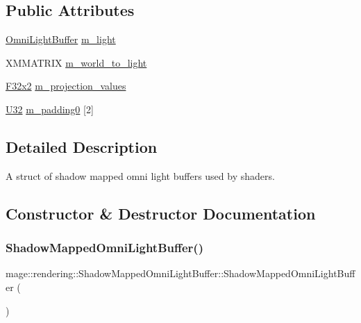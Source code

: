 \subsection*{Public Attributes}
\begin{DoxyCompactItemize}
\item 
\hyperlink{structmage_1_1rendering_1_1_omni_light_buffer}{Omni\+Light\+Buffer} \hyperlink{structmage_1_1rendering_1_1_shadow_mapped_omni_light_buffer_a6b316ed6c8b69d5aeb15fbe93c23de95}{m\+\_\+light}
\item 
X\+M\+M\+A\+T\+R\+IX \hyperlink{structmage_1_1rendering_1_1_shadow_mapped_omni_light_buffer_a6ad3f982000ca1d68c3897589aa89798}{m\+\_\+world\+\_\+to\+\_\+light}
\item 
\hyperlink{namespacemage_aa87237ad091f5cd7da612b8523fc108f}{F32x2} \hyperlink{structmage_1_1rendering_1_1_shadow_mapped_omni_light_buffer_a29016735134bb44c6c6f0d52fbf9ef2c}{m\+\_\+projection\+\_\+values}
\item 
\hyperlink{namespacemage_a41c104c036fba3756a74e19f793eeaa1}{U32} \hyperlink{structmage_1_1rendering_1_1_shadow_mapped_omni_light_buffer_a01a76a39534ba04a2b1fe77ae5d1522c}{m\+\_\+padding0} \mbox{[}2\mbox{]}
\end{DoxyCompactItemize}


\subsection{Detailed Description}
A struct of shadow mapped omni light buffers used by shaders. 

\subsection{Constructor \& Destructor Documentation}
\hypertarget{structmage_1_1rendering_1_1_shadow_mapped_omni_light_buffer_a3b9f6ffd582185ea739410aeeec8a446}{}\label{structmage_1_1rendering_1_1_shadow_mapped_omni_light_buffer_a3b9f6ffd582185ea739410aeeec8a446} 
\subsubsection{\texorpdfstring{Shadow\+Mapped\+Omni\+Light\+Buffer()}{ShadowMappedOmniLightBuffer()}\hspace{0.1cm}{\footnotesize\ttfamily [1/3]}}
{\footnotesize\ttfamily mage\+::rendering\+::\+Shadow\+Mapped\+Omni\+Light\+Buffer\+::\+Shadow\+Mapped\+Omni\+Light\+Buffer (\begin{DoxyParamCaption}{ }\end{DoxyParamCaption})\hspace{0.3cm}{\ttfamily [noexcept]}}

